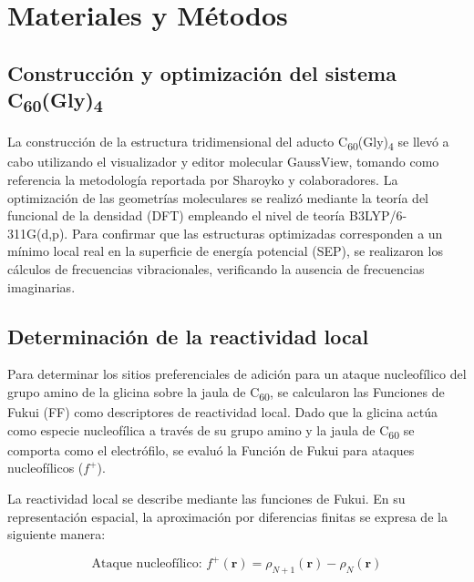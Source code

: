 \titleformat{\chapter}[display]
  {\normalfont\bfseries}{}{0pt}{\Large} %
\chapter{Materiales y Métodos}
\section{Construcción y optimización del sistema C\textsubscript{60}(Gly)\textsubscript{4}}
La construcción de la estructura tridimensional del aducto C\textsubscript{60}(Gly)\textsubscript{4} se llevó a cabo utilizando el visualizador y editor molecular GaussView, tomando como referencia la metodología reportada por Sharoyko y colaboradores. La optimización de las geometrías moleculares se realizó mediante la teoría del funcional de la densidad (DFT) empleando el nivel de teoría B3LYP/6-311G(d,p). Para confirmar que las estructuras optimizadas corresponden a un mínimo local real en la superficie de energía potencial (SEP), se realizaron los cálculos de frecuencias vibracionales, verificando la ausencia de frecuencias imaginarias.
\section{Determinación de la reactividad local}
Para determinar los sitios preferenciales de adición para un ataque nucleofílico del grupo amino de la glicina sobre la jaula de C\textsubscript{60}, se calcularon las Funciones de Fukui (FF) como descriptores de reactividad local. Dado que la glicina actúa como especie nucleofílica a través de su grupo amino y la jaula de C\textsubscript{60} se comporta como el electrófilo, se evaluó la Función de Fukui para ataques nucleofílicos ($f^+$). 

La reactividad local se describe mediante las funciones de Fukui. En su representación espacial, la aproximación por diferencias finitas se expresa de la siguiente manera:

\begin{equation}
    \text{Ataque nucleofílico: } f^+(\mathbf{r}) = \rho_{N+1}(\mathbf{r}) - \rho_N(\mathbf{r})
\end{equation}

